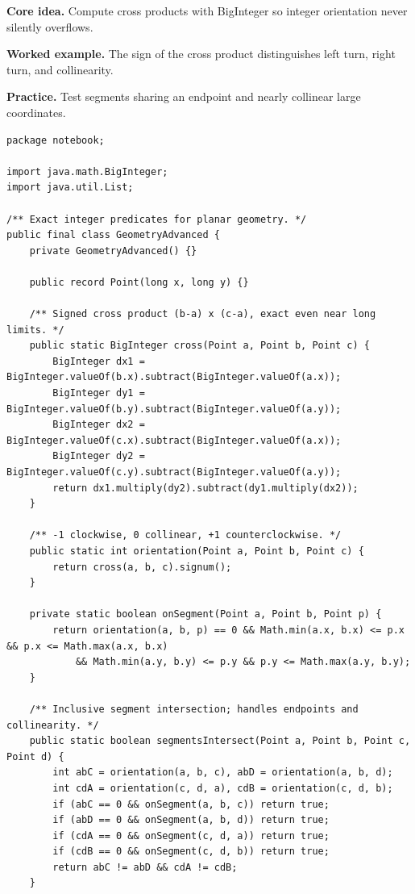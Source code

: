 \documentclass[10pt,letterpaper]{article}
\begin{document}
\noindent\textbf{Core idea.} Compute cross products with BigInteger so integer orientation never silently overflows.\par
\noindent\textbf{Worked example.} The sign of the cross product distinguishes left turn, right turn, and collinearity.\par
\noindent\textbf{Practice.} Test segments sharing an endpoint and nearly collinear large coordinates.\par
\begin{lstlisting}
package notebook;

import java.math.BigInteger;
import java.util.List;

/** Exact integer predicates for planar geometry. */
public final class GeometryAdvanced {
    private GeometryAdvanced() {}

    public record Point(long x, long y) {}

    /** Signed cross product (b-a) x (c-a), exact even near long limits. */
    public static BigInteger cross(Point a, Point b, Point c) {
        BigInteger dx1 = BigInteger.valueOf(b.x).subtract(BigInteger.valueOf(a.x));
        BigInteger dy1 = BigInteger.valueOf(b.y).subtract(BigInteger.valueOf(a.y));
        BigInteger dx2 = BigInteger.valueOf(c.x).subtract(BigInteger.valueOf(a.x));
        BigInteger dy2 = BigInteger.valueOf(c.y).subtract(BigInteger.valueOf(a.y));
        return dx1.multiply(dy2).subtract(dy1.multiply(dx2));
    }

    /** -1 clockwise, 0 collinear, +1 counterclockwise. */
    public static int orientation(Point a, Point b, Point c) {
        return cross(a, b, c).signum();
    }

    private static boolean onSegment(Point a, Point b, Point p) {
        return orientation(a, b, p) == 0 && Math.min(a.x, b.x) <= p.x && p.x <= Math.max(a.x, b.x)
            && Math.min(a.y, b.y) <= p.y && p.y <= Math.max(a.y, b.y);
    }

    /** Inclusive segment intersection; handles endpoints and collinearity. */
    public static boolean segmentsIntersect(Point a, Point b, Point c, Point d) {
        int abC = orientation(a, b, c), abD = orientation(a, b, d);
        int cdA = orientation(c, d, a), cdB = orientation(c, d, b);
        if (abC == 0 && onSegment(a, b, c)) return true;
        if (abD == 0 && onSegment(a, b, d)) return true;
        if (cdA == 0 && onSegment(c, d, a)) return true;
        if (cdB == 0 && onSegment(c, d, b)) return true;
        return abC != abD && cdA != cdB;
    }


\end{lstlisting}
\end{document}
